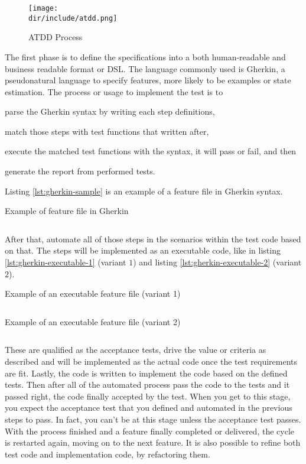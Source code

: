 \begin{figure}[!htb]
    \centering
    \texttt{[image: \\dir/include/atdd.png]}
    \caption{ATDD Process}
    \label{fig:atdd}
\end{figure}

The first phase is to define the specifications into a both human-readable and business readable format or \ac{DSL}.
The language commonly used is Gherkin, a pseudonatural language to specify features, more likely to be examples or state estimation.
The process or usage to implement the test is to
\begin{inparaenum}[\itshape 1\upshape)]
\item parse the Gherkin syntax by writing each step definitions,
\item match those steps with test functions that written after,
\item execute the matched test functions with the syntax, it will pass or fail, and then
\item generate the report from performed tests.
\end{inparaenum}
Listing \autoref{lst:gherkin-sample} is an example of a feature file in Gherkin syntax.

\begin{listing}[!htb]
\caption{Example of feature file in Gherkin}
\inputminted{ruby}{\dir/include/gherkin-sample.txt}
\label{lst:gherkin-sample}
\end{listing}

After that, automate all of those steps in the scenarios within the test code based on that.
The steps will be implemented as an executable code, like in listing \autoref{lst:gherkin-executable-1} (variant $1$) and listing \autoref{lst:gherkin-executable-2} (variant $2$).

\begin{listing}[!htb]
\caption{Example of an executable feature file (variant 1)}
\inputminted{javascript}{\dir/include/gherkin-executable-1.js}
\label{lst:gherkin-executable-1}
\end{listing}

\begin{listing}[!htb]
\caption{Example of an executable feature file (variant 2)}
\inputminted{javascript}{\dir/include/gherkin-executable-2.js}
\label{lst:gherkin-executable-2}
\end{listing}

These are qualified as the acceptance tests, drive the value or criteria as described and will be implemented as the actual code once the test requirements are fit.
Lastly, the code is written to implement the code based on the defined tests.
Then after all of the automated process pass the code to the tests and it passed right, the code finally accepted by the test.
When you get to this stage, you expect the acceptance test that you defined and automated in the previous steps to pass. In fact, you can't be at this stage unless the acceptance test passes.
With the process finished and a feature finally completed or delivered, the cycle is restarted again, moving on to the next feature.
It is also possible to refine both test code and implementation code, by refactoring them.
